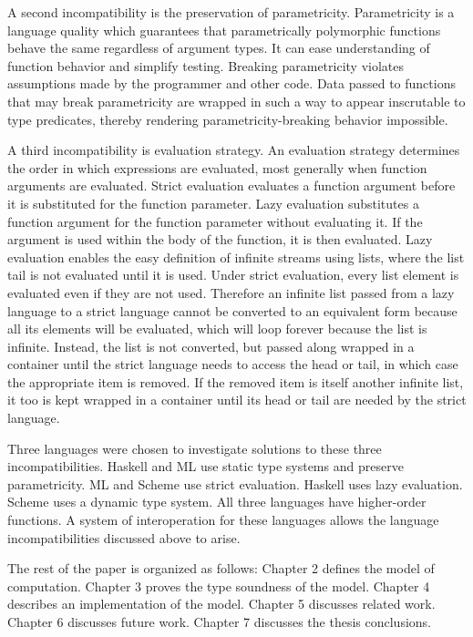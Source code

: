 A second incompatibility is the preservation of parametricity.  Parametricity is a language quality which guarantees that parametrically polymorphic functions behave the same regardless of argument types.  It can ease understanding of function behavior and simplify testing.  Breaking parametricity violates assumptions made by the programmer and other code.  Data passed to functions that may break parametricity are wrapped in such a way to appear inscrutable to type predicates, thereby rendering parametricity-breaking behavior impossible.

A third incompatibility is evaluation strategy.  An evaluation strategy determines the order in which expressions are evaluated, most generally when function arguments are evaluated.  Strict evaluation evaluates a function argument before it is substituted for the function parameter.  Lazy evaluation substitutes a function argument for the function parameter without evaluating it.  If the argument is used within the body of the function, it is then evaluated.  Lazy evaluation enables the easy definition of infinite streams using lists, where the list tail is not evaluated until it is used.  Under strict evaluation, every list element is evaluated even if they are not used.  Therefore an infinite list passed from a lazy language to a strict language cannot be converted to an equivalent form because all its elements will be evaluated, which will loop forever because the list is infinite.  Instead, the list is not converted, but passed along wrapped in a container until the strict language needs to access the head or tail, in which case the appropriate item is removed.  If the removed item is itself another infinite list, it too is kept wrapped in a container until its head or tail are needed by the strict language.

Three languages were chosen to investigate solutions to these three incompatibilities.  Haskell and ML use static type systems and preserve parametricity.  ML and Scheme use strict evaluation.  Haskell uses lazy evaluation.  Scheme uses a dynamic type system.  All three languages have higher-order functions.  A system of interoperation for these languages allows the language incompatibilities discussed above to arise.  

The rest of the paper is organized as follows: Chapter 2 defines the model of computation.  Chapter 3 proves the type soundness of the model.  Chapter 4 describes an implementation of the model.  Chapter 5 discusses related work.  Chapter 6 discusses future work.  Chapter 7 discusses the thesis conclusions.